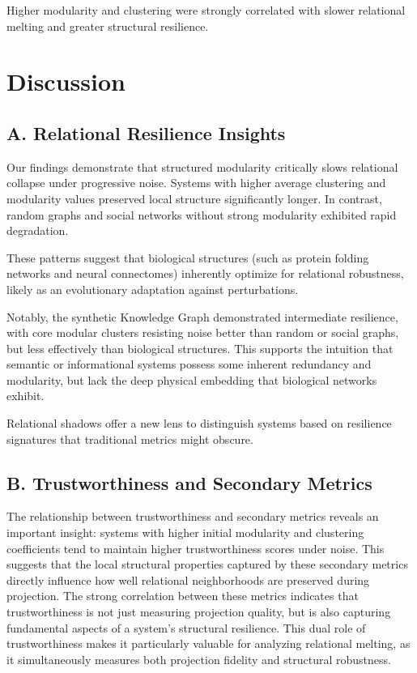 \documentclass[conference]{IEEEtran}
\begin{document}
Higher modularity and clustering were strongly correlated with slower relational melting and greater structural resilience.

\clearpage
\section{Discussion}

\subsection*{\textbf{A. Relational Resilience Insights}}
Our findings demonstrate that structured modularity critically slows relational collapse under progressive noise.  
Systems with higher average clustering and modularity values preserved local structure significantly longer.  
In contrast, random graphs and social networks without strong modularity exhibited rapid degradation.

These patterns suggest that biological structures (such as protein folding networks and neural connectomes) inherently optimize for relational robustness, likely as an evolutionary adaptation against perturbations.

Notably, the synthetic Knowledge Graph demonstrated intermediate resilience, with core modular clusters resisting noise better than random or social graphs, but less effectively than biological structures. This supports the intuition that semantic or informational systems possess some inherent redundancy and modularity, but lack the deep physical embedding that biological networks exhibit.

Relational shadows offer a new lens to distinguish systems based on resilience signatures that traditional metrics might obscure.

\subsection*{\textbf{B. Trustworthiness and Secondary Metrics}}
The relationship between trustworthiness and secondary metrics reveals an important insight: systems with higher initial modularity and clustering coefficients tend to maintain higher trustworthiness scores under noise. This suggests that the local structural properties captured by these secondary metrics directly influence how well relational neighborhoods are preserved during projection. The strong correlation between these metrics indicates that trustworthiness is not just measuring projection quality, but is also capturing fundamental aspects of a system's structural resilience. This dual role of trustworthiness makes it particularly valuable for analyzing relational melting, as it simultaneously measures both projection fidelity and structural robustness.
\end{document}
